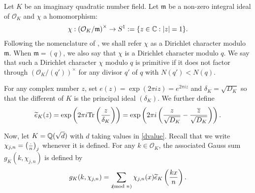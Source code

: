 \documentclass[twoside,leqno,10pt, A4]{amsart}
\begin{document}
  Let $K$ be an imaginary quadratic number field.  Let $\mathfrak{m}$ be a non-zero integral ideal of $\mathcal O_K$ and $\chi$ a homomorphism:
\begin{align*}
  \chi: \left (\mathcal{O}_K / \mathfrak{m} \right )^{\times}  \rightarrow S^1 :=\{ z \in \mathbb C :  |z|=1 \}.
\end{align*}
Following the nomenclature of \cite[Section 3.8]{iwakow}, we shall refer $\chi$ as a Dirichlet character modulo $\mathfrak{m}$. When $\mathfrak{m}=(q)$, we also say that $\chi$ is a Dirichlet character modulo $q$. We say that such a Dirichlet character $\chi$ modulo $q$ is primitive if it does not factor through $\left (\mathcal{O}_K / (q') \right )^{\times}$ for any divisor $q'$ of $q$ with $N(q')<N(q)$. \newline

    For any complex number $z$, set $e(z) = \exp (2 \pi i z) = e^{2 \pi i z}$ and $\delta_K=\sqrt{D_K}$ so that the different of $K$ is the principal ideal $(\delta_K)$.  We further define
\begin{align*}
   \widetilde{e}_K(z) =\exp \left( 2 \pi i {\rm Tr} \left( \frac {z}{\delta_K} \right) \right)=\exp \left( 2\pi i  \left( \frac {z}{\sqrt{D_K}} -
\frac {\overline{z}}{\sqrt{D_K}} \right) \right).
\end{align*}

    Now, let $K=\mathbb Q(\sqrt{d})$ with $d$ taking values in \eqref{dvalue}. Recall that we write $\chi_{j, n} =\left(\frac{\cdot}{n}\right)_j$ whenever it is defined. For any $k \in
\mathcal{O}_K$, the associated Gauss sum $g_K(k, \chi_{j, n})$ is defined by
\begin{align*}
 g_K(k,\chi_{j, n}) = \sum_{x \negthickspace \negthickspace \negthickspace \pmod{n}} \chi_{j,n}(x) \widetilde{e}_K\left(\frac{kx}{n}\right).
\end{align*}
\end{document}
